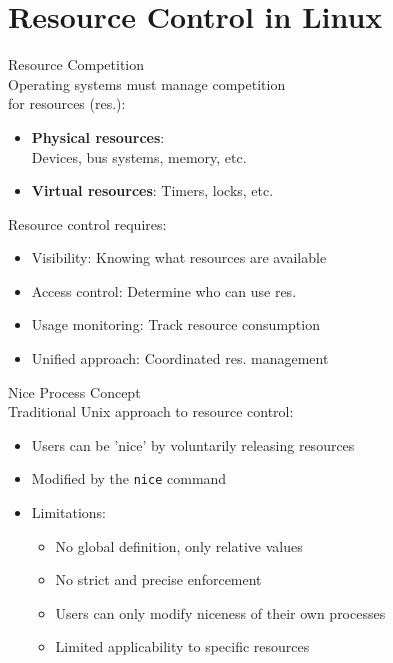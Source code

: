 \section{Resource Control in Linux}


\begin{concept}{Resource Competition}\\
    Operating systems must manage competition\\ for resources (res.):
    \begin{itemize}
        \item \textbf{Physical resources}: \\ Devices, bus systems, memory, etc.
        \item \textbf{Virtual resources}: Timers, locks, etc.
    \end{itemize}
    
    Resource control requires:
    \begin{itemize}
        \item Visibility: Knowing what resources are available
        \item Access control: Determine who can use res.
        \item Usage monitoring: Track resource consumption
        \item Unified approach: Coordinated res. management
    \end{itemize}
\end{concept}

\begin{definition}{Nice Process Concept}\\
    Traditional Unix approach to resource control:
    \begin{itemize}
        \item Users can be 'nice' by voluntarily releasing resources
        \item Modified by the \texttt{nice} command
        \item Limitations:
            \begin{itemize}
                \item No global definition, only relative values
                \item No strict and precise enforcement
                \item Users can only modify niceness of their own processes
                \item Limited applicability to specific resources
            \end{itemize}
    \end{itemize}
\end{definition}

